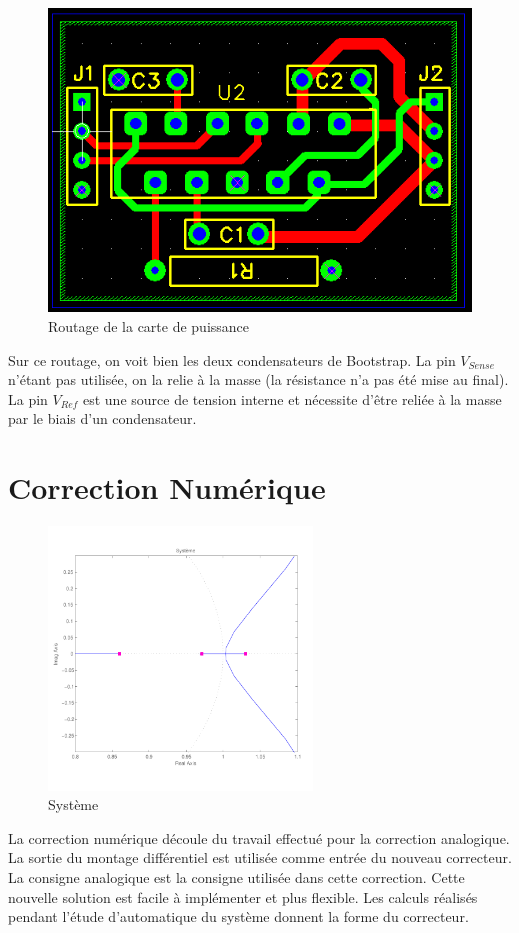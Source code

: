 \documentclass[11pt, french]{article} %
\begin{document}
\begin{figure}[h!]
	\centering
	\includegraphics[width = 12cm]{SolutionNumerique/routage.png} 
	\caption{Routage de la carte de puissance}
\end{figure}

Sur ce routage, on voit bien les deux condensateurs de Bootstrap. La pin $V_{Sense}$ n'étant pas utilisée, on la relie à la masse (la résistance n'a pas été mise au final). La pin $V_{Ref}$ est une source de tension interne et nécessite d'être reliée à la masse par le biais d'un condensateur. 


\section{Correction Numérique}
\begin{figure}
		
	\includegraphics[width = 7cm,trim=0 1.4cm 0 1.2cm ,clip=true]
					{SolutionNumerique/Systeme.pdf}
	\caption{Système}
\end{figure}
La correction numérique découle du travail effectué pour la correction analogique. La sortie du montage différentiel est utilisée comme entrée du nouveau correcteur. La consigne analogique est la consigne utilisée dans cette correction.
Cette nouvelle solution est facile à implémenter et plus flexible. Les calculs réalisés pendant l'étude d'automatique du système donnent la forme du correcteur.
\end{document}
